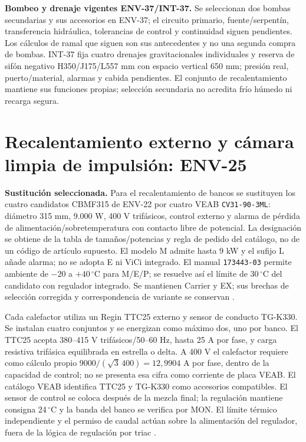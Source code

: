 \textbf{Bombeo y drenaje vigentes ENV-37/INT-37.} Se seleccionan dos bombas secundarias y sus accesorios en ENV-37; el circuito primario, fuente/serpentín, transferencia hidráulica, tolerancias de control y continuidad siguen pendientes. Los cálculos de ramal que siguen son sus antecedentes y no una segunda compra de bombas. INT-37 fija cuatro drenajes gravitacionales individuales y reserva de sifón negativo H350/J175/L557 mm con espacio vertical 650 mm; presión real, puerto/material, alarmas y cabida pendientes. El conjunto de recalentamiento mantiene sus funciones propias; selección secundaria no acredita frío húmedo ni recarga segura.

\section{Recalentamiento externo y cámara limpia de impulsión: ENV-25}
\label{sec:ambiente-env25}
\textbf{Sustitución seleccionada.} Para el recalentamiento de bancos se sustituyen los cuatro candidatos CBMF315 de ENV-22 por cuatro VEAB \texttt{CV31-90-3ML}: diámetro 315 mm, 9.000 W, 400 V trifásicos, control externo y alarma de pérdida de alimentación/sobretemperatura con contacto libre de potencial. La designación se obtiene de la tabla de tamaños/potencias y regla de pedido del catálogo, no de un código de artículo supuesto. El modelo M admite hasta 9 kW y el sufijo L añade alarma; no se adopta E ni ViCi integrado. El manual \texttt{173443-03} permite ambiente de $-20$ a $+40\,^{\circ}$C para M/E/P; se resuelve así el límite de 30\,$^{\circ}$C del candidato con regulador integrado. Se mantienen Carrier y EX; sus brechas de selección corregida y correspondencia de variante se conservan \parencite[pp.~4--5 y 10]{lote25-veab-cv,lote25-veab-manual}.

Cada calefactor utiliza un Regin TTC25 externo y sensor de conducto TG-K330. Se instalan cuatro conjuntos y se energizan como máximo dos, uno por banco. El TTC25 acepta 380--415 V trifásicos/50--60 Hz, hasta 25 A por fase, y carga resistiva trifásica equilibrada en estrella o delta. A 400 V el calefactor requiere como cálculo propio $9000/(\sqrt{3}\,400)=12,9904$ A por fase, dentro de la capacidad de control; no se presenta esa cifra como corriente de placa VEAB. El catálogo VEAB identifica TTC25 y TG-K330 como accesorios compatibles. El sensor de control se coloca después de la mezcla final; la regulación mantiene consigna 24\,$^{\circ}$C y la banda del banco se verifica por MON. El límite térmico independiente y el permiso de caudal actúan sobre la alimentación del regulador, fuera de la lógica de regulación por triac \parencite[pp.~14--15]{lote25-veab-cv}\parencite{lote25-ttc-manual,lote25-ttc-ficha}.

